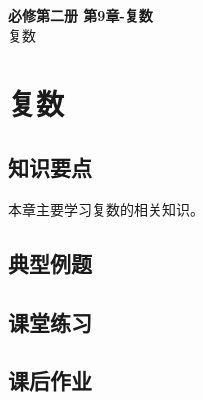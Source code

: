 \documentclass[12pt,a4paper]{article}
\begin{document}
\begin{center}
\LARGE\textbf{必修第二册 第9章-复数} \\[0.5em]
\large 复数
\end{center}

\tableofcontents
\newpage

\section{复数}

\subsection{知识要点}
本章主要学习复数的相关知识。

\subsection{典型例题}

\subsection{课堂练习}

\subsection{课后作业}
\end{document}
